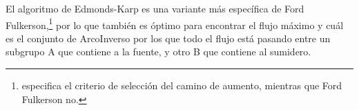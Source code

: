 \documentclass[../tp3_grupo404.tex]{subfiles}
\begin{document}
El algoritmo de Edmonds-Karp es una variante más específica de Ford Fulkerson,\footnote{
    especifica el criterio de selección del camino de aumento, mientras que Ford Fulkerson no.}
por lo que también es óptimo para encontrar el flujo máximo y cuál es el conjunto de ArcoInverso
por los que todo el flujo está pasando entre un subgrupo A que contiene a la fuente, y otro B que
contiene al sumidero.

\end{document}
